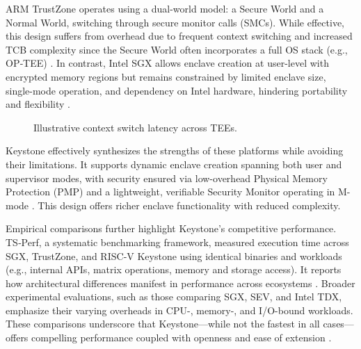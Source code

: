 ARM TrustZone operates using a dual-world model: a Secure World and a Normal World, switching through secure monitor calls (SMCs). While effective, this design suffers from overhead due to frequent context switching and increased TCB complexity since the Secure World often incorporates a full OS stack (e.g., OP‑TEE) \cite{turn0search0}. In contrast, Intel SGX allows enclave creation at user-level with encrypted memory regions but remains constrained by limited enclave size, single-mode operation, and dependency on Intel hardware, hindering portability and flexibility \cite{turn0search0}.

\begin{figure}[htbp]
\centering
{}
\caption{Illustrative context switch latency across TEEs.}
\label{fig:ctx-overhead}
\end{figure}
Keystone effectively synthesizes the strengths of these platforms while avoiding their limitations. It supports dynamic enclave creation spanning both user and supervisor modes, with security ensured via low-overhead Physical Memory Protection (PMP) and a lightweight, verifiable Security Monitor operating in M-mode \cite{dayeol2019keystone}. This design offers richer enclave functionality with reduced complexity.

Empirical comparisons further highlight Keystone’s competitive performance. TS‑Perf, a systematic benchmarking framework, measured execution time across SGX, TrustZone, and RISC‑V Keystone using identical binaries and workloads (e.g., internal APIs, matrix operations, memory and storage access). It reports how architectural differences manifest in performance across ecosystems \cite{turn0search5}. Broader experimental evaluations, such as those comparing SGX, SEV, and Intel TDX, emphasize their varying overheads in CPU-, memory-, and I/O-bound workloads. These comparisons underscore that Keystone—while not the fastest in all cases—offers compelling performance coupled with openness and ease of extension \cite{turn0search2,turn0search10}.

